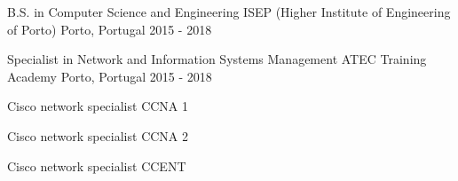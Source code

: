 

\begin{cventries}

    \cventry
      {B.S. in Computer Science and Engineering} %
      {ISEP (Higher Institute of Engineering of Porto)} %
      {Porto, Portugal} %
      {2015 - 2018} %
      {
      }
  
  
    \cventry
      {Specialist in Network and Information Systems Management} %
      {ATEC Training Academy} %
      {Porto, Portugal} %
      {2015 - 2018} %
      {
        \begin{cvitems} %
          \item {Cisco network specialist CCNA 1}
          \item {Cisco network specialist CCNA 2}
          \item {Cisco network specialist CCENT}
        \end{cvitems}
      }
  
  
  
  \end{cventries}
  
